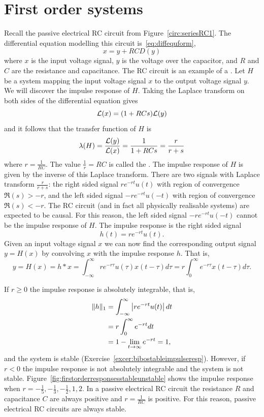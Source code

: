 \section{First order systems}\label{sec:first-order-systems}

Recall the passive electrical RC circuit from Figure~\ref{circ:seriesRC1}.  The differential equation modelling this circuit is~\eqref{eq:diffequform},
\[
x = y + RC D(y)
\] 
where $x$ is the input voltage signal, $y$ is the voltage over the capacitor, and $R$ and $C$ are the resistance and capacitance.  The RC circuit is an example of a .  Let $H$ be a system mapping the input voltage signal $x$ to the output voltage signal $y$.  We will discover the impulse response of $H$.  Taking the Laplace transform on both sides of the differential equation gives
\[
\mathcal L(x) = (1 + RC s ) \mathcal L(y)
\]
and it follows that the transfer function of $H$ is
\[
\lambda(H) = \frac{\mathcal L(y)}{\mathcal L(x)} = \frac{1}{1 + RC s} = \frac{r}{r + s}
\]
where $r = \tfrac{1}{RC}$.  The value $\tfrac{1}{r} = RC$ is called the .  The impulse response of $H$ is given by the inverse of this Laplace transform.  There are two signals with Laplace transform $\frac{r}{r + s}$: the right sided signal $r e^{-r t} u(t)$ with region of convergence $\Re(s) > -r$, and the left sided signal $-r e^{-r t} u(-t)$ with region of convergence $\Re(s) < -r$.  The RC circuit (and in fact all physically realisable systems) are expected to be causal.  For this reason, the left sided signal $ -r e^{-r t} u(-t)$ cannot be the impulse response of $H$.  The impulse response is the right sided signal
\[
h(t) = r e^{-r t} u(t).
\]
Given an input voltage signal $x$ we can now find the corresponding output signal $y = H(x)$ by convolving $x$ with the impulse response $h$.  That is,
\[
y = H(x) = h * x = \int_{-\infty}^{\infty} r e^{-r \tau} u(\tau) x(t - \tau) d\tau = r \int_{0}^{\infty} e^{-r \tau} x(t - \tau) d\tau.
\] 

If $r \geq 0$ the impulse response is absolutely integrable, that is,
\begin{align*}
\|h\|_1 &= \int_{-\infty}^\infty \left\vert r e^{-r t} u(t) \right\vert dt \\
&= r \int_{0}^\infty e^{-r t} dt \\
&= 1 - \lim_{t\to\infty} e^{-r t} = 1,
\end{align*}
and the system is stable (Exercise~\ref{excer:bibostableimpulseresp}).  However, if $r < 0$ the impulse response is not absolutely integrable and the system is not stable.  Figure~\ref{fig:firstorderresponsesstableunstable} shows the impulse response when $r=-\frac{1}{5}, -\tfrac{1}{3}, -\tfrac{1}{2}, 1, 2$.  In a passive electrical RC circuit the resistance $R$ and capacitance $C$ are always positive and $r=\tfrac{1}{RC}$ is positive. For this reason, passive electrical RC circuits are always stable.

